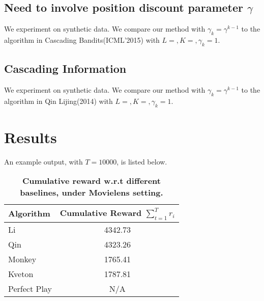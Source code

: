 \documentclass[a4paper,11pt]{article}
\begin{document}
\subsection{Need to involve position discount parameter $\gamma$}

We experiment on synthetic data. We compare our method with $\gamma_k = \gamma^{k-1}$ to the algorithm in Cascading Bandits(ICML'2015) with $L= , K= , \gamma_k=1$.

\subsection{Cascading Information}

We experiment on synthetic data. We compare our method with $\gamma_k = \gamma^{k-1}$ to the algorithm in Qin Lijing(2014) with $L= , K= , \gamma_k=1$.

\section{Results}

An example output, with $T=10000$, is listed below.

\begin{table}
    \centering
    \renewcommand{\arraystretch}{1.2}
	\begin{tabular}{lc}
	    \toprule
		\textbf{Algorithm}  &\textbf{Cumulative Reward $\sum_{t=1}^Tr_i $}\\
		\midrule
		Li		    &4342.73 \\
		Qin		    &4323.26 \\
		Monkey		    &1765.41 \\
		Kveton		    &1787.81 \\
		Perfect Play		    &N/A \\
		\bottomrule
	\end{tabular}
	\caption{\textbf{Cumulative reward w.r.t different baselines, under Movielens setting.}}
	\label{daily}
\end{table}
\end{document}
